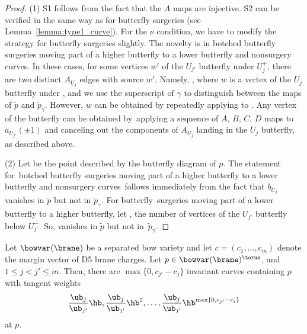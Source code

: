 \begin{proof}
(1) S1 follows from the fact that the $A$ maps are injective. S2 can be verified in the same way as for butterfly surgeries (see Lemma~\ref{lemma:type1_curve}). For the $\nu$ condition, we have to modify the strategy for butterfly surgeries slightly. The novelty is in botched butterfly surgeries moving part of a higher butterfly to a lower butterfly and nonsurgery curves. In these cases, for some vertices $w'$ of the $U_{j'}$ butterfly under $U_j^+$, there are two distinct $A_{U_j}$ edges with source $w'$. Namely, , where $w$ is a vertex of the $U_j$ butterfly under , and we use the superscript of $\gamma$ to distinguish between the maps of $\tilde{p}$ and $\tilde{p}_\gamma$. However, $w$ can be obtained by repeatedly applying  to . Any vertex of the  butterfly can be obtained by~applying a sequence of $A$, $B$, $C$, $D$ maps to $a_{U_{j'}}(\pm 1)$ and canceling out the components of $A_{U_j}$ landing in the $U_j$ butterfly, as described above.

(2) Let  be the point described by the butterfly diagram of $p$. The statement for~bot\-ched butterfly surgeries moving part of a higher butterfly to a lower butterfly and non\-sur\-gery curves~follows immediately from the fact that $b_{U_j}$ vanishes in $\tilde{p}$ but not in $\tilde{p}_\gamma$. For \linebreak butterfly~surgeries moving part of a lower butterfly to a higher butterfly, let
,
the number of vertices of the $U_{j'}$ butterfly below $U_{j'}^-$. So,  vanishes in $\tilde{p}$ but not in~$\tilde{p}_\gamma$.
\end{proof}

\begin{Lemma} \label{lemma:nonsurgery}
Let $\bowvar(\brane)$ be a separated bow variety and let $c = (c_1, \dots , c_m)$ denote the margin vector of D5 brane charges. Let $p\in \bowvar(\brane)^\torus$, and $1\leq j < j' \leq m$. Then, there are $\max\{0, c_{j'} - c_j\}$ invariant curves containing $p$ with tangent weights
\[
\frac{\ub_j}{\ub_{j'}}\hb, \frac{\ub_j}{\ub_{j'}}\hb^2, \dots , \frac{\ub_j}{\ub_{j'}}\hb^{\max\{0, c_{j'} - c_j\}}
\]
at $p$.
\end{Lemma}


